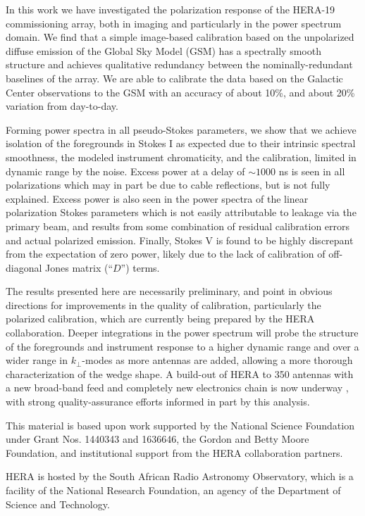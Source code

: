 \documentclass[twocolumn, trackchanges]{aastex61}
\begin{document}
In this work we have investigated the polarization response of the HERA-19
commissioning array, both in imaging and particularly in the power spectrum
domain.  We find that a simple image-based calibration based on the unpolarized
diffuse emission of the Global Sky Model (GSM) has a spectrally smooth structure
and achieves qualitative redundancy between the nominally-redundant baselines of
the array.  We are able to calibrate the data based on the Galactic Center
observations to the GSM with an accuracy of about 10\%, and about 20\% variation
from day-to-day.

Forming power spectra in all pseudo-Stokes parameters, we show that we achieve
isolation of the foregrounds in Stokes I as expected due to their intrinsic
spectral smoothness, the modeled instrument chromaticity, and the calibration,
limited in dynamic range by the noise.  Excess power at a delay of $\sim1000$ ns
is seen in all polarizations which may in part be due to cable reflections, but
is not fully explained.  Excess power is also seen in the power spectra of the
linear polarization Stokes parameters which is not easily attributable to
leakage via the primary beam, and results from some combination of residual
calibration errors and actual polarized emission.  Finally, Stokes V is found to
be highly discrepant from the expectation of zero power, likely due to the lack
of calibration of off-diagonal Jones matrix (``$D$'') terms.

The results presented here are necessarily preliminary, and point in obvious
directions for improvements in the quality of calibration, particularly the
polarized calibration, which are currently being prepared by the HERA
collaboration.  Deeper integrations in the power spectrum will probe the
structure of the foregrounds and instrument response to a higher dynamic range
and over a wider range in $k_{\perp}$-modes as more antennas are added, allowing
a more thorough characterization of the wedge shape.  A build-out of HERA to 350
antennas with a new broad-band feed and completely new electronics chain is now
underway \cite{deBoer17}, with strong quality-assurance efforts informed in part
by this analysis.


\acknowledgements

This material is based upon work supported by the National Science Foundation
under Grant Nos. 1440343 and 1636646, the Gordon and Betty Moore Foundation, and
institutional support from the HERA collaboration partners.

HERA is hosted by the South African Radio Astronomy Observatory, which is a
facility of the National Research Foundation, an agency of the Department of
Science and Technology.
\end{document}
